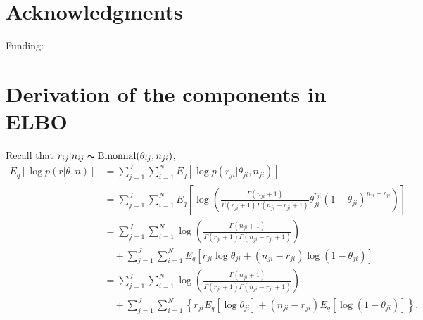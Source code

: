 \documentclass[11pt,reqno]{amsart}
\begin{document}
\section{Acknowledgments}
Funding:
%
\appendix
\section{Derivation of the components in ELBO}
\label{appendix:ELBO}
Recall that $r_{ij}|n_{ij}\thicksim \text{Binomial}(\theta_{ij}, n _{ji})$,
\begin{equation}
\begin{split}
E_q \left[ \log p\left(r | \theta, n \right)\right] &= \sum_{j=1}^{J} \sum_{i=1}^{N} E_q  \left[ \log p \left( r_{ji} | \theta_{ji}, n_{ji} \right) \right] \\
&= \sum_{j=1}^{J} \sum_{i=1}^{N}  E_q  \left[ \log \left( \frac{ \Gamma(n_{ji}+1) } { \Gamma(r_{ji}+1) \Gamma( n_{ji} - r_{ji} + 1 ) } \theta_{ji}^{r_{ji}} (1 - \theta_{ji})^{n_{ji} - r_{ji}} \right) \right] \\
&= \sum_{j=1}^{J} \sum_{i=1}^{N} \log \left( \frac{ \Gamma(n_{ji}+1) } { \Gamma(r_{ji}+1) \Gamma( n_{ji} - r_{ji} + 1 ) }\right)  \\
&\quad + \sum_{j=1}^{J} \sum_{i=1}^{N}  E_q  \left[ r_{ji} \log \theta_{ji} + (n_{ji} - r_{ji}) \log (1 - \theta_{ji}) \right] \\
&= \sum_{j=1}^{J} \sum_{i=1}^{N} \log \left( \frac{ \Gamma(n_{ji}+1) } { \Gamma(r_{ji}+1) \Gamma( n_{ji} - r_{ji} + 1 ) }\right)  \\
&\quad + \sum_{j=1}^{J} \sum_{i=1}^{N} \left\lbrace r_{ji} E_q \left[ \log \theta_{ji} \right] + (n_{ji} - r_{ji}) E_q  \left[  \log (1 - \theta_{ji}) \right] \right\rbrace. \\
\end{split}
\end{equation}
\end{document}

